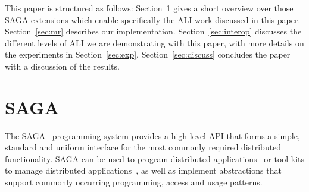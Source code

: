 \documentclass[3p,twocolumn]{elsarticle}
\begin{document}



This paper is structured as follows: Section~\ref{sec:saga} gives a
short overview over those SAGA extensions which enable specifically
the ALI work discussed in this paper.  Section~\ref{sec:mr} describes
our \smr implementation.  Section~\ref{sec:interop} discusses the
different levels of ALI we are demonstrating with this paper, with
more details on the experiments in Section~\ref{sec:exp}.
Section~\ref{sec:discuss} concludes the paper with a discussion of the
results.









\section{SAGA}
\label{sec:saga}

The SAGA~\cite{saga-core, Kaiser:2006qp} programming system provides a
high level API that forms a simple, standard and uniform interface for
the most commonly required distributed functionality.  SAGA can be
used to program distributed applications~\cite{saga_escience07,
saga_tg08} or tool-kits to manage distributed
applications~\cite{Luckow:2008xy}, as well as implement abstractions
that support commonly occurring programming, access and usage
patterns.
\end{document}
